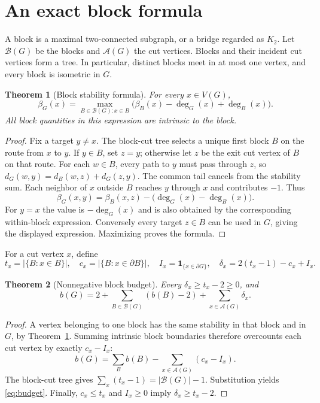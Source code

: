 \documentclass[11pt,a4paper]{article}
\newtheorem{theorem}{Theorem}[section]
\theoremstyle{definition}\newtheorem{definition}[theorem]{Definition}
\theoremstyle{remark}\newtheorem{remark}[theorem]{Remark}
\newcommand{\bd}{\partial}
\newcommand{\stab}{\beta}
\newcommand{\cuts}{\mathcal A}
\newcommand{\blocks}{\mathcal B}
\newcommand{\dd}{\operatorname{deg}}
\newcommand{\ind}{\mathbf 1}
\begin{document}





\section{An exact block formula}
A block is a maximal two-connected subgraph, or a bridge regarded as $K_2$.
Let $\blocks(G)$ be the blocks and $\cuts(G)$ the cut vertices. Blocks and their
incident cut vertices form a tree. In particular, distinct blocks meet in at
most one vertex, and every block is isometric in $G$.

\begin{theorem}[Block stability formula]\label{thm:block}
For every $x\in V(G)$,
\begin{equation}\label{eq:block}
 \stab_G(x)=\max_{B\in\blocks(G):x\in B}
       \bigl(\stab_B(x)-\dd_G(x)+\dd_B(x)\bigr).
\end{equation}
All block quantities in this expression are intrinsic to the block.
\end{theorem}
\begin{proof}
Fix a target $y\ne x$. The block-cut tree selects a unique first block $B$
on the route from $x$ to $y$. If $y\in B$, set $z=y$; otherwise let $z$ be
the exit cut vertex of $B$ on that route. For each $w\in B$, every path to $y$
must pass through $z$, so
$d_G(w,y)=d_B(w,z)+d_G(z,y)$. The common tail cancels from the stability sum.
Each neighbor of $x$ outside $B$ reaches $y$ through $x$ and contributes $-1$.
Thus
\[
 \stab_G(x,y)=\stab_B(x,z)-\bigl(\dd_G(x)-\dd_B(x)\bigr).
\]
For $y=x$ the value is $-\dd_G(x)$ and is also obtained by the corresponding
within-block expression. Conversely every target $z\in B$ can be used in
$G$, giving the displayed expression. Maximizing proves the formula.
\end{proof}

For a cut vertex $x$, define
\[
 t_x=|\{B:x\in B\}|,\quad
 c_x=|\{B:x\in\bd B\}|,\quad
 I_x=\ind_{\{x\in\bd G\}},\quad
 \delta_x=2(t_x-1)-c_x+I_x.
\]
\begin{theorem}[Nonnegative block budget]\label{thm:budget}
Every $\delta_x\ge t_x-2\ge0$, and
\begin{equation}\label{eq:budget}
 b(G)=2+\sum_{B\in\blocks(G)}(b(B)-2)
                  +\sum_{x\in\cuts(G)}\delta_x.
\end{equation}
\end{theorem}
\begin{proof}
A vertex belonging to one block has the same stability in that block and in
$G$, by Theorem~\ref{thm:block}. Summing intrinsic block boundaries therefore
overcounts each cut vertex by exactly $c_x-I_x$:
\[
 b(G)=\sum_B b(B)-\sum_{x\in\cuts(G)}(c_x-I_x).
\]
The block-cut tree gives $\sum_x(t_x-1)=|\blocks(G)|-1$. Substitution yields
\eqref{eq:budget}. Finally, $c_x\le t_x$ and $I_x\ge0$ imply
$\delta_x\ge t_x-2$.
\end{proof}
\end{document}

